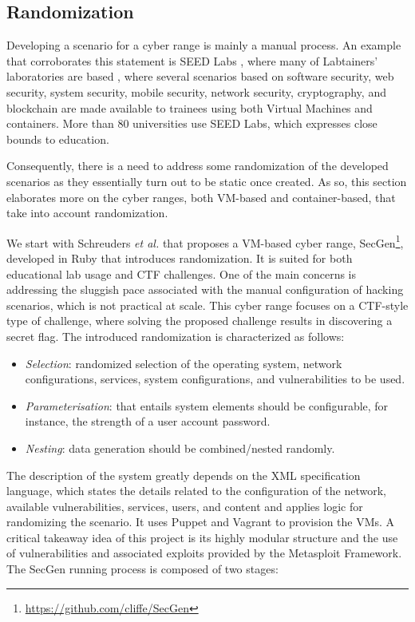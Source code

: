 \subsection{Randomization} \label{sec:randomization_cr}

Developing a scenario for a cyber range is mainly a manual process. An example that corroborates this statement is SEED Labs \cite{seed_labs_ref}, where many of Labtainers' laboratories are based \cite{labtainers_ref}, where several scenarios based on software security, web security, system security, mobile security, network security, cryptography, and blockchain are made available to trainees using both Virtual Machines and containers. More than 80 universities use SEED Labs, which expresses close bounds to education.

Consequently, there is a need to address some randomization of the developed scenarios as they essentially turn out to be static once created. As so, this section elaborates more on the cyber ranges, both VM-based and container-based, that take into account randomization.


We start with Schreuders \textit{et al.} \cite{secgen_ref} that proposes a VM-based cyber range, SecGen\footnote{\url{https://github.com/cliffe/SecGen}}, developed in Ruby that introduces randomization. It is suited for both educational lab usage and CTF challenges. One of the main concerns is addressing the sluggish pace associated with the manual configuration of hacking scenarios, which is not practical at scale. This cyber range focuses on a CTF-style type of challenge, where solving the proposed challenge results in discovering a secret flag. The introduced randomization is characterized as follows:

\begin{itemize}
    \item \textit{Selection}: randomized selection of the operating system, network configurations, services, system configurations, and vulnerabilities to be used.
    \item \textit{Parameterisation}: that entails system elements should be configurable, for instance, the strength of a user account password.
    \item \textit{Nesting}: data generation should be combined/nested randomly.
\end{itemize}

The description of the system greatly depends on the XML specification language, which states the details related to the configuration of the network, available vulnerabilities, services, users, and content and applies logic for randomizing the scenario. It uses Puppet and Vagrant to provision the VMs. A critical takeaway idea of this project is its highly modular structure and the use of vulnerabilities and associated exploits provided by the Metasploit Framework. The SecGen running process is composed of two stages:

